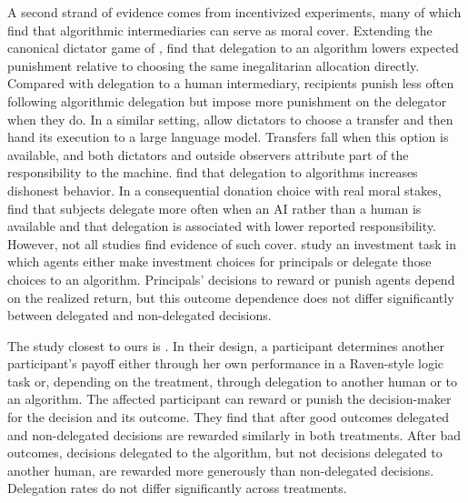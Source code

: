 A second strand of evidence comes from incentivized experiments, many of which find that algorithmic intermediaries can serve as moral cover. Extending the canonical dictator game of \citet{bartling_shifting_2012}, \citet{chevrier_algorithm_2024} find that delegation to an algorithm lowers expected punishment relative to choosing the same inegalitarian allocation directly. Compared with delegation to a human intermediary, recipients punish less often following algorithmic delegation but impose more punishment on the delegator when they do. %
In a similar setting, \citet{tontrup_strategic_2025} allow dictators to choose a transfer and then hand its execution to a large language model. Transfers fall when this option is available, and both dictators and outside observers attribute part of the responsibility to the machine. \citet{kobis_delegation_2025} find that delegation to algorithms increases dishonest behavior. In a consequential donation choice with real moral stakes, \citet{hueholt_trusting_2026} find that subjects delegate more often when an AI rather than a human is available and that delegation is associated with lower reported responsibility. However, not all studies find evidence of such cover. \citet{ismagilova_aint_2025} study an investment task in which agents either make investment choices for principals or delegate those choices to an algorithm. Principals’ decisions to reward or punish agents depend on the realized return, but this outcome dependence does not differ significantly between delegated and non-delegated decisions.

The study closest to ours is \citet{feier_hiding_2022}. In their design, a participant determines another participant's payoff either through her own performance in a Raven-style logic task or, depending on the treatment, through delegation to another human or to an algorithm. The affected participant can reward or punish the decision-maker for the decision and its outcome. They find that after good outcomes delegated and non-delegated decisions are rewarded similarly in both treatments. After bad outcomes, decisions delegated to the algorithm, but not decisions delegated to another human, are rewarded more generously than non-delegated decisions. Delegation rates do not differ significantly across treatments.

